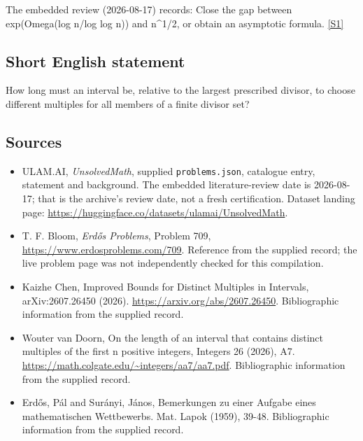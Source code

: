 \documentclass[11pt,a4paper]{article}
\newcommand{\sref}[2]{\hyperlink{source:#1:#2}{[S#2]}}
\begin{document}
The embedded review (2026-08-17) records: Close the gap between exp(Omega(log n/log log n)) and n\textasciicircum{}{1/2}, or obtain an asymptotic formula. \sref{statement}{1}

\subsection{Short English statement}

How long must an interval be, relative to the largest prescribed divisor, to choose different multiples for all members of a finite divisor set?

\subsection{Sources}

{\small

\begin{itemize}

\item[\hypertarget{source:statement:1}{S1}] ULAM.AI, \emph{UnsolvedMath}, supplied \texttt{problems.json}, catalogue entry, statement and background. The embedded literature-review date is 2026-08-17; that is the archive’s review date, not a fresh certification. Dataset landing page: \url{https://huggingface.co/datasets/ulamai/UnsolvedMath}.

\item[\hypertarget{source:statement:2}{S2}] T. F. Bloom, \emph{Erdős Problems}, Problem 709, \url{https://www.erdosproblems.com/709}. Reference from the supplied record; the live problem page was not independently checked for this compilation.

\item[\hypertarget{source:statement:3}{S3}] Kaizhe Chen, Improved Bounds for Distinct Multiples in Intervals, arXiv:2607.26450 (2026). \url{https://arxiv.org/abs/2607.26450}. Bibliographic information from the supplied record.

\item[\hypertarget{source:statement:4}{S4}] Wouter van Doorn, On the length of an interval that contains distinct multiples of the first n positive integers, Integers 26 (2026), A7. \url{https://math.colgate.edu/~integers/aa7/aa7.pdf}. Bibliographic information from the supplied record.

\item[\hypertarget{source:statement:5}{S5}] Erd\H{o}s, P\'{a}l and Sur\'{a}nyi, J\'{a}nos, Bemerkungen zu einer Aufgabe eines mathematischen {W}ettbewerbs. Mat. Lapok (1959), 39-48. Bibliographic information from the supplied record.

\end{itemize}

}

\label{end:statement}
\end{document}
